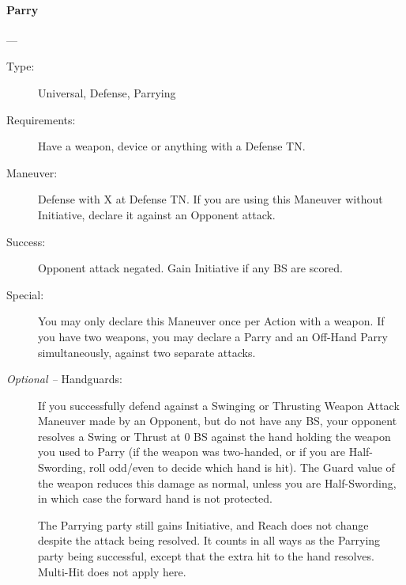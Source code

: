 \documentclass[oneside,11pt,english]{book}
\begin{document}
\paragraph{\large\label{man:Parry}Parry}---\quad{\large[X]}
\vspace{-10pt}\begin{description} 
\item [Type:] Universal, Defense, Parrying 
\item [Requirements:] Have a weapon, device or anything with a Defense TN. 
\item [Maneuver:] Defense with X at Defense TN. If you are using this Maneuver without Initiative, declare it 
  against an Opponent attack. 
\item [Success:] Opponent attack negated. Gain Initiative if any BS are scored. 
\item [Special:] You may only declare this Maneuver once per Action with a weapon. If you have two weapons, 
  you may declare a Parry and an Off-Hand Parry simultaneously, against two separate attacks. 

\item [\emph{Optional --} Handguards:] If you successfully defend against a Swinging or Thrusting Weapon Attack 
  Maneuver made by an Opponent, but do not have any BS, your opponent resolves a Swing or Thrust at 0 
  BS against the hand holding the weapon you used to Parry (if the weapon was two-handed, or if you are 
  Half-Swording, roll odd/even to decide which hand is hit). The Guard value of the weapon reduces this 
  damage as normal, unless you are Half-Swording, in which case the forward hand is not protected. 

  The Parrying party still gains Initiative, and Reach does not change despite the attack being resolved. It counts 
  in all ways as the Parrying party being successful, except that the extra hit to the hand resolves. Multi-Hit does not apply here. 
\end{description}
\end{document}
